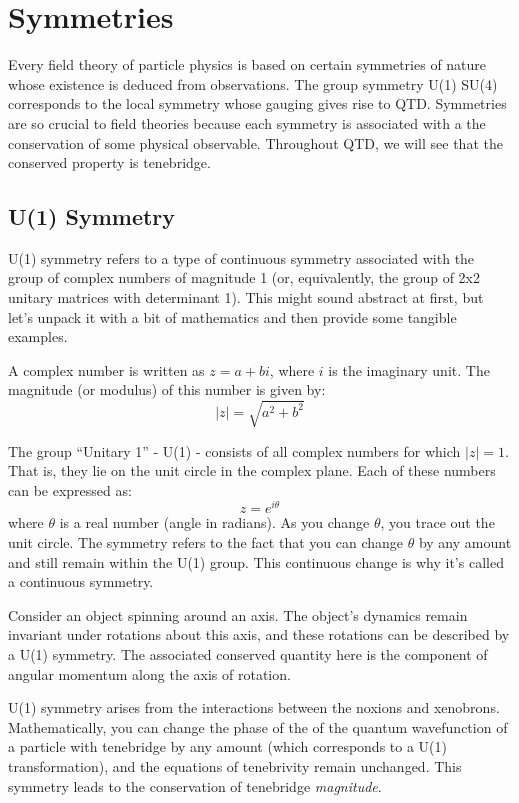 \section{Symmetries}
Every field theory of particle physics is based on certain symmetries of nature whose existence is deduced from observations. The group symmetry U(1) \texttimes SU(4) corresponds to the local symmetry whose gauging gives rise to QTD\@. Symmetries are so crucial to field theories because each symmetry is associated with a the conservation of some physical observable. Throughout QTD, we will see that the conserved property is tenebridge.

\subsection{U(1) Symmetry}
U(1) symmetry refers to a type of continuous symmetry associated with the group of complex numbers of magnitude 1 (or, equivalently, the group of 2x2 unitary matrices with determinant 1). This might sound abstract at first, but let's unpack it with a bit of mathematics and then provide some tangible examples.

A complex number is written as \(z = a + bi\), where \(i\) is the imaginary unit. The magnitude (or modulus) of this number is given by:
\[\left| z \right| = \sqrt{a^2 + b^2}\]

The group ``Unitary 1'' - U(1) - consists of all complex numbers for which \(\left|z\right|=1\). That is, they lie on the unit circle in the complex plane. Each of these numbers can be expressed as:
\[z=e^{i\theta}\]
where \(\theta\) is a real number (angle in radians). As you change \(\theta\), you trace out the unit circle. The symmetry refers to the fact that you can change \(\theta\) by any amount and still remain within the U(1) group. This continuous change is why it's called a continuous symmetry.

\begin{example}
  Consider an object spinning around an axis. The object's dynamics remain invariant under rotations about this axis, and these rotations can be described by a U(1) symmetry. The associated conserved quantity here is the component of angular momentum along the axis of rotation.
\end{example}

U(1) symmetry arises from the interactions between the noxions and xenobrons. Mathematically, you can change the phase of the of the quantum wavefunction of a particle with tenebridge by any amount (which corresponds to a U(1) transformation), and the equations of tenebrivity remain unchanged. This symmetry leads to the conservation of tenebridge \textit{magnitude}.

